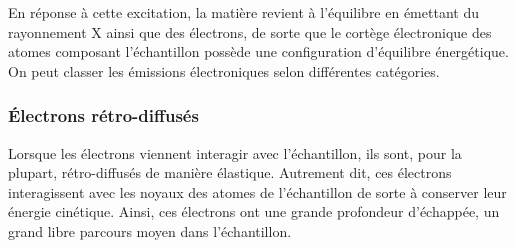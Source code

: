 \documentclass[a4paper,12pt]{article}
\begin{document}
En réponse à cette excitation, la matière revient à l'équilibre en émettant du rayonnement X ainsi que des électrons, 
de sorte que le cortège électronique des atomes composant l'échantillon possède une configuration d'équilibre énergétique. 
On peut classer les émissions électroniques selon différentes catégories.

\subsubsection*{Électrons rétro-diffusés}
Lorsque les électrons viennent interagir avec l'échantillon, ils sont, pour la plupart, rétro-diffusés de manière élastique.
Autrement dit, ces électrons interagissent avec les noyaux des atomes de l'échantillon de sorte à conserver leur énergie cinétique.
Ainsi, ces électrons ont une grande profondeur d'échappée, un grand libre parcours moyen dans l'échantillon.
\end{document}
